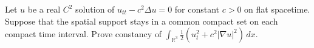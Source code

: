 Let \(u\) be a real \(C^2\) solution of \(u_{tt}-c^2\Delta u=0\) for constant
\(c>0\) on flat spacetime. Suppose that the spatial support stays in a common
compact set on each compact time interval. Prove constancy of
\(\int_{\mathbb R^3}\tfrac12(u_t^2+c^2|\nabla u|^2)\,dx\).
